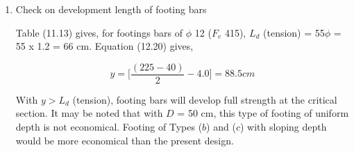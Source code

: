 \documentclass{book}
\begin{document}
\begin{enumerate}
Table 19 of the Code gives,
$$\sage{tau_c}=0.32N/mm^2$$
$$K = 1.0$$
        $$\sage{tau_a}=\sage{tau_c}=0.032kN/cm^2$$
$$\sage{tau_v}=\sage{tau_a}, D = 50cm \text{ is safe}$$

        \item Check on development length of footing bars

Table (11.13) gives, for footings bars of $\phi$ 12 ($F_e$ 415),
$L_d$ (tension) = 55$\phi$ = 55 x 1.2 = 66 cm.
Equation (12.20) gives, 

$$y=\bigg[\frac{(225-40)}{2}-4.0\bigg]=88.5cm$$

With $y > L_d$ (tension), footing bars will develop full strength at the critical section. It may be noted that with $D$ = 50 cm, this type of footing of uniform depth is not economical. Footing of Types ($b$) and ($c$) with sloping depth would be more economical than the present design.\\
\end{enumerate} 

\end{document}
